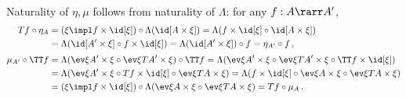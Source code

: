 \documentclass{svmult}
\begin{document}
\begin{itemize}
\begin{align*}
    \end{align*}
    Naturality of $\eta,\mu$ follows from naturality of $\Lambda$: for any $f:A\rarr A'$,
    \begin{align*}
      Tf\circ\eta_A &= (\xi\impl f\times\id[\xi])\circ\Lambda(\id[A\times\xi]) = \Lambda(f\times\id[\xi]\circ\id[A\times\xi]) \\
        &= \Lambda(\id[A'\times\xi]\circ f\times\id[\xi]) = \Lambda(\id[A'\times\xi])\circ f = \eta_{A'}\circ f\,, \\[1mm]
      \mu_{A'}\circ\TT f &= \Lambda(\ev\xi{A'\times\xi}\circ\ev\xi{TA'\times\xi})\circ\TT f
        = \Lambda(\ev\xi{A'\times\xi}\circ\ev\xi{TA'\times\xi}\circ\TT f\times\id[\xi]) \\
        &= \Lambda(\ev\xi{A'\times\xi}\circ Tf\times\id[\xi]\circ\ev\xi{TA\times\xi})
        = \Lambda(f\times\id[\xi]\circ\ev\xi{A\times\xi}\circ\ev\xi{TA\times\xi}) \\
        &= (\xi\impl f\times\id[\xi])\circ\Lambda(\ev\xi{A\times\xi}\circ\ev\xi{TA\times\xi}) = Tf\circ\mu_A\,.
    \end{align*}

\end{itemize}
\end{document}
